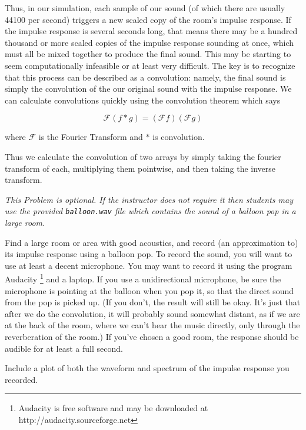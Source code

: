 Thus, in our simulation, each sample of our sound (of which there are usually 44100 per second) triggers a new scaled copy of the room's impulse response. If the impulse response is several seconds long, that means there may be a hundred thousand or more scaled copies of the impulse response sounding at once, which must all be mixed together to produce the final sound. This may be starting to seem computationally infeasible or at least very difficult. The key is to recognize that this process can be described as a convolution: namely, the final sound is simply the convolution of the our original sound with the impulse response. We can calculate convolutions quickly using the convolution theorem which says

\[\mathcal{F}(f \ast g) = (\mathcal{F} f) (\mathcal{F} g)\]

where $\mathcal{F}$ is the Fourier Transform and $\ast$ is convolution.

Thus we calculate the convolution of two arrays by simply taking the fourier transform of each, multiplying them pointwise, and then taking the inverse transform.

\begin{problem}
\emph{This Problem is optional.  If the instructor does not require it then students may use the provided \texttt{balloon.wav} file which contains the sound of a balloon pop in a large room.}

Find a large room or area with good acoustics, and record (an approximation to) its impulse response using a balloon pop. To record the sound, you will want to use at least a decent microphone. You may want to record it using the program Audacity \footnote{Audacity is free software and may be downloaded at http://audacity.sourceforge.net} and a laptop. If you use a unidirectional microphone, be sure the microphone is pointing at the balloon when you pop it, so that the direct sound from the pop is picked up. (If you don't, the result will still be okay. It's just that after we do the convolution, it will probably sound somewhat distant, as if we are at the back of the room, where we can't hear the music directly, only through the reverberation of the room.)
If you've chosen a good room, the response should be audible for at least a full second.

Include a plot of both the waveform and spectrum of the impulse response you recorded.
\end{problem}


